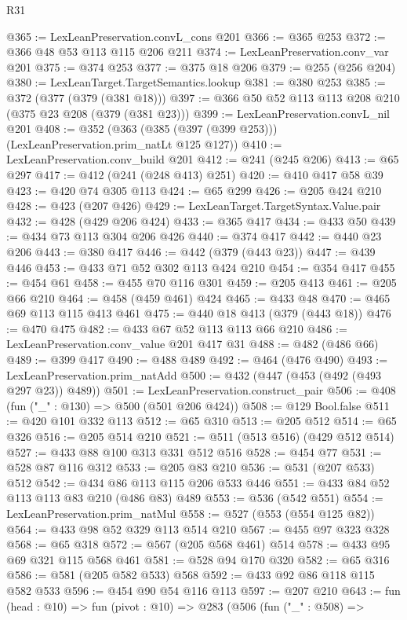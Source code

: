 \begin{lexlean}{R31}
\begin{coremodule}
@365 := LexLeanPreservation.convL_cons @201
@366 := @365 @253
@372 := @366 @48 @53 @113 @115 @206 @211
@374 := LexLeanPreservation.conv_var @201
@375 := @374 @253
@377 := @375 @18 @206
@379 := @255 (@256 @204)
@380 := LexLeanTarget.TargetSemantics.lookup
@381 := @380 @253
@385 := @372 (@377 (@379 (@381 @18)))
@397 := @366 @50 @52 @113 @113 @208 @210 (@375 @23 @208 (@379 (@381 @23)))
@399 := LexLeanPreservation.convL_nil @201
@408 := @352 (@363 (@385 (@397 (@399 @253))) (LexLeanPreservation.prim_natLt @125 @127))
@410 := LexLeanPreservation.conv_build @201
@412 := @241 (@245 @206)
@413 := @65 @297
@417 := @412 (@241 (@248 @413) @251)
@420 := @410 @417 @58 @39
@423 := @420 @74 @305 @113
@424 := @65 @299
@426 := @205 @424 @210
@428 := @423 (@207 @426)
@429 := LexLeanTarget.TargetSyntax.Value.pair
@432 := @428 (@429 @206 @424)
@433 := @365 @417
@434 := @433 @50
@439 := @434 @73 @113 @304 @206 @426
@440 := @374 @417
@442 := @440 @23 @206
@443 := @380 @417
@446 := @442 (@379 (@443 @23))
@447 := @439 @446
@453 := @433 @71 @52 @302 @113 @424 @210
@454 := @354 @417
@455 := @454 @61
@458 := @455 @70 @116 @301
@459 := @205 @413
@461 := @205 @66 @210
@464 := @458 (@459 @461) @424
@465 := @433 @48
@470 := @465 @69 @113 @115 @413 @461
@475 := @440 @18 @413 (@379 (@443 @18))
@476 := @470 @475
@482 := @433 @67 @52 @113 @113 @66 @210
@486 := LexLeanPreservation.conv_value @201 @417 @31
@488 := @482 (@486 @66)
@489 := @399 @417
@490 := @488 @489
@492 := @464 (@476 @490)
@493 := LexLeanPreservation.prim_natAdd
@500 := @432 (@447 (@453 (@492 (@493 @297 @23)) @489))
@501 := LexLeanPreservation.construct_pair
@506 := @408 (fun ("_" : @130) => @500 (@501 @206 @424))
@508 := @129 Bool.false
@511 := @420 @101 @332 @113
@512 := @65 @310
@513 := @205 @512
@514 := @65 @326
@516 := @205 @514 @210
@521 := @511 (@513 @516) (@429 @512 @514)
@527 := @433 @88 @100 @313 @331 @512 @516
@528 := @454 @77
@531 := @528 @87 @116 @312
@533 := @205 @83 @210
@536 := @531 (@207 @533) @512
@542 := @434 @86 @113 @115 @206 @533 @446
@551 := @433 @84 @52 @113 @113 @83 @210 (@486 @83) @489
@553 := @536 (@542 @551)
@554 := LexLeanPreservation.prim_natMul
@558 := @527 (@553 (@554 @125 @82))
@564 := @433 @98 @52 @329 @113 @514 @210
@567 := @455 @97 @323 @328
@568 := @65 @318
@572 := @567 (@205 @568 @461) @514
@578 := @433 @95 @69 @321 @115 @568 @461
@581 := @528 @94 @170 @320
@582 := @65 @316
@586 := @581 (@205 @582 @533) @568
@592 := @433 @92 @86 @118 @115 @582 @533
@596 := @454 @90 @54 @116 @113
@597 := @207 @210
@643 := fun (head : @10) =>
  fun (pivot : @10) =>
  @283
    (@506
      (fun ("_" : @508) =>

\end{coremodule}
\end{lexlean}
